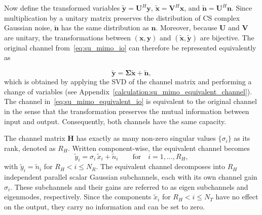 Now define the transformed variables $\tilde{\mathbf{y}} = \mathbf{U}^H \mathbf{y}$, $\tilde{\mathbf{x}} = \mathbf{V}^H \mathbf{x}$, and $\tilde{\mathbf{n}} = \mathbf{U}^H \mathbf{n}$.
Since multiplication by a unitary matrix preserves the distribution of \ac{CS} complex Gaussian noise, $\tilde{\mathbf{n}}$ has the same distribution as $\mathbf{n}$. 
Moreover, because $\mathbf{U}$ and $\mathbf{V}$ are unitary, the transformations between $(\mathbf{x},\mathbf{y})$ and $(\tilde{\mathbf{x}},\tilde{\mathbf{y}})$ are bijective. 
The original channel from~\eqref{eq:su_mimo_io} can therefore be represented equivalently as

\begin{equation}
\label{eq:su_mimo_equivalent_io}
    \tilde{\mathbf{y}} = \mathbf{\Sigma}\tilde{\mathbf{x}} + \tilde{\mathbf{n}},
\end{equation}
which is obtained by applying the \ac{SVD} of the channel matrix and performing a change of variables (see Appendix~\ref{calculation:su_mimo_equivalent_channel}). 
The channel in~\eqref{eq:su_mimo_equivalent_io} is equivalent to the original channel in the sense that the transformation preserves the mutual information between input and output. Consequently, both channels have the same capacity.

The channel matrix $\mathbf{H}$ has exactly as many non-zero singular values $\{\sigma_i\}$ as its rank, denoted as $R_H$.
Written component-wise, the equivalent channel becomes
\begin{equation}
\label{eq:su_mimo_equivalent_io_component_wise}
    \tilde{y}_i = \sigma_i \, \tilde{x}_i + \tilde{n}_i \qquad \text{for} \quad i = 1, \dots, R_H,
\end{equation}
with $\tilde{y}_i = \tilde{n}_i$ for $R_H < i \leq N_R$. 
The equivalent channel decomposes into $R_H$ independent parallel scalar Gaussian subchannels, each with its own channel gain $\sigma_i$. These subchannels and their gains are referred to as eigen subchannels and eigenmodes, respectively.
Since the components $\tilde{x}_i$ for $R_H < i \leq N_T$ have no effect on the output, they carry no information and can be set to zero.

